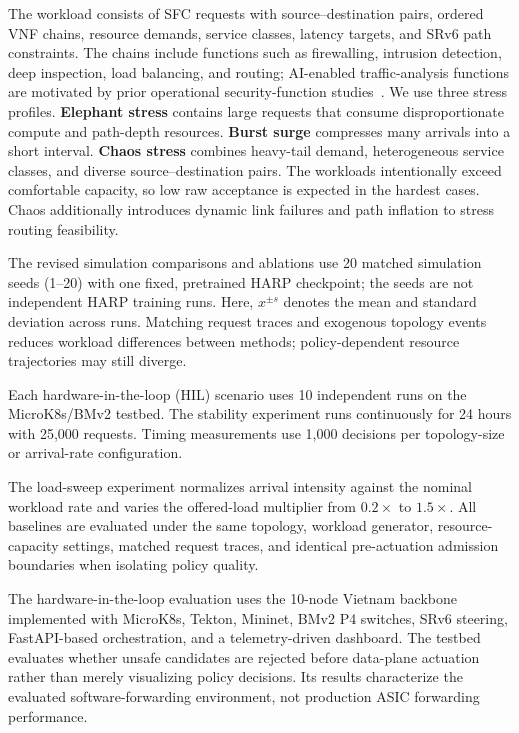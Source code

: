 \documentclass[final,5p]{elsarticle}
\newcommand{\rev}[1]{\textcolor{BrickRed}{#1}}
\begin{document}
The workload consists of SFC requests with source--destination pairs, ordered VNF chains, resource demands, service classes, latency targets, and SRv6 path constraints. The chains include functions such as firewalling, intrusion detection, deep inspection, load balancing, and routing; AI-enabled traffic-analysis functions are motivated by prior operational security-function studies~\cite{jSAID23,jAPELID24,cCSFS25}. We use three stress profiles. \textbf{Elephant stress} contains large requests that consume disproportionate compute and path-depth resources. \textbf{Burst surge} compresses many arrivals into a short interval. \textbf{Chaos stress} combines heavy-tail demand, heterogeneous service classes, and diverse source--destination pairs. The workloads intentionally exceed comfortable capacity, so low raw acceptance is expected in the hardest cases. \rev{Chaos additionally introduces dynamic link failures and path inflation to stress routing feasibility.}

\rev{The revised simulation comparisons and ablations use 20 matched simulation seeds (1--20) with one fixed, pretrained HARP checkpoint; the seeds are not independent HARP training runs. Here, \(x^{\pm s}\) denotes the mean and standard deviation across runs. Matching request traces and exogenous topology events reduces workload differences between methods; policy-dependent resource trajectories may still diverge.}

\rev{Each hardware-in-the-loop (HIL) scenario uses 10 independent runs on the MicroK8s/BMv2 testbed. The stability experiment runs continuously for 24 hours with 25,000 requests. Timing measurements use 1,000 decisions per topology-size or arrival-rate configuration.}


The load-sweep experiment normalizes arrival intensity against the nominal workload rate and varies the offered-load multiplier from $0.2\times$ to $1.5\times$. All baselines are evaluated under the same topology, workload generator, resource-capacity settings, matched request traces, and identical pre-actuation admission boundaries when isolating policy quality.

The hardware-in-the-loop evaluation uses the 10-node Vietnam backbone implemented with MicroK8s, Tekton, Mininet, BMv2 P4 switches, SRv6 steering, FastAPI-based orchestration, and a telemetry-driven dashboard. The testbed evaluates whether unsafe candidates are rejected before data-plane actuation rather than merely visualizing policy decisions. \rev{Its results characterize the evaluated software-forwarding environment, not production ASIC forwarding performance.}
\end{document}
